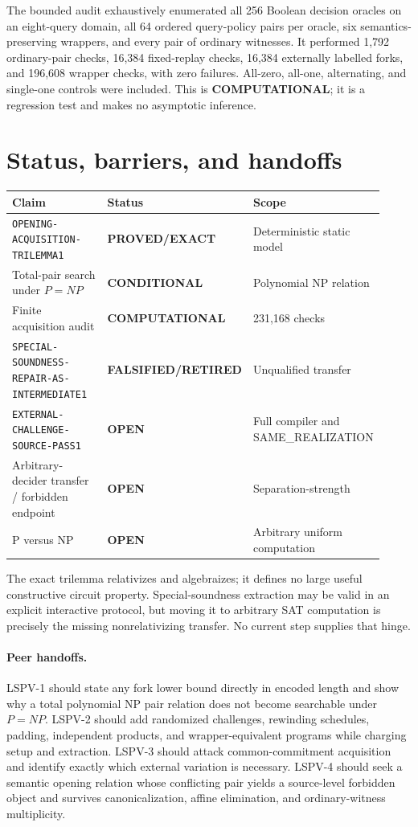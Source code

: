 \documentclass[11pt]{article}
\newcommand{\EXACT}{\textbf{PROVED/EXACT}}
\newcommand{\COMP}{\textbf{COMPUTATIONAL}}
\newcommand{\COND}{\textbf{CONDITIONAL}}
\newcommand{\OPEN}{\textbf{OPEN}}
\newcommand{\RETIRED}{\textbf{FALSIFIED/RETIRED}}
\begin{document}
The bounded audit exhaustively enumerated all 256 Boolean decision oracles on
an eight-query domain, all 64 ordered query-policy pairs per oracle, six
semantics-preserving wrappers, and every pair of ordinary witnesses.  It
performed 1,792 ordinary-pair checks, 16,384 fixed-replay checks, 16,384
externally labelled forks, and 196,608 wrapper checks, with zero failures.
All-zero, all-one, alternating, and single-one controls were included.  This
is \COMP; it is a regression test and makes no asymptotic inference.

\section{Status, barriers, and handoffs}
\begin{center}\small
\begin{tabular}{p{0.49\linewidth}p{0.20\linewidth}p{0.23\linewidth}}
\toprule
Claim & Status & Scope\\ \midrule
\texttt{OPENING-ACQUISITION-TRILEMMA1} & \EXACT & Deterministic static model\\
Total-pair search under $P=NP$ & \COND & Polynomial NP relation\\
Finite acquisition audit & \COMP & 231,168 checks\\
\texttt{SPECIAL-SOUNDNESS-REPAIR-AS-INTERMEDIATE1} & \RETIRED & Unqualified transfer\\
\texttt{EXTERNAL-CHALLENGE-SOURCE-PASS1} & \OPEN & Full compiler and SAME\_REALIZATION\\
Arbitrary-decider transfer / forbidden endpoint & \OPEN & Separation-strength\\
P versus NP & \OPEN & Arbitrary uniform computation\\
\bottomrule
\end{tabular}
\end{center}

The exact trilemma relativizes and algebraizes; it defines no large useful
constructive circuit property.  Special-soundness extraction may be valid in
an explicit interactive protocol, but moving it to arbitrary SAT computation
is precisely the missing nonrelativizing transfer.  No current step supplies
that hinge.

\paragraph{Peer handoffs.}
LSPV-1 should state any fork lower bound directly in encoded length and show
why a total polynomial NP pair relation does not become searchable under
$P=NP$.  LSPV-2 should add randomized challenges, rewinding schedules,
padding, independent products, and wrapper-equivalent programs while charging
setup and extraction.  LSPV-3 should attack common-commitment acquisition and
identify exactly which external variation is necessary.  LSPV-4 should seek
a semantic opening relation whose conflicting pair yields a source-level
forbidden object and survives canonicalization, affine elimination, and
ordinary-witness multiplicity.
\end{document}
